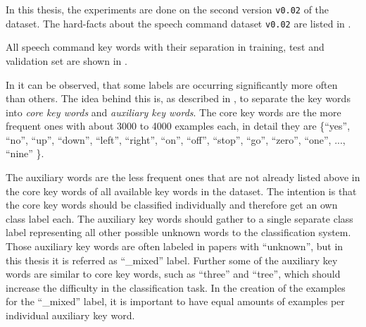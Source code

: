 In this thesis, the experiments are done on the second version \texttt{v0.02} of the dataset.
The hard-facts about the speech command dataset \texttt{v0.02} are listed in .

All speech command key words with their separation in training, test and validation set are shown in .

In  it can be observed, that some labels are occurring significantly more often than others.
The idea behind this is, as described in \cite{Warden2018}, to separate the key words into \emph{core key words} and \emph{auxiliary key words}.
The core key words are the more frequent ones with about 3000 to 4000 examples each, in detail they are \{\enquote{yes}, \enquote{no}, \enquote{up}, \enquote{down}, \enquote{left}, \enquote{right}, \enquote{on}, \enquote{off}, \enquote{stop}, \enquote{go}, \enquote{zero}, \enquote{one}, ..., \enquote{nine} \}.

The auxiliary words are the less frequent ones that are not already listed above in the core key words of all available key words in the dataset.
The intention is that the core key words should be classified individually and therefore get an own class label each. 
The auxiliary key words should gather to a single separate class label representing all other possible unknown words to the classification system.
Those auxiliary key words are often labeled in papers with \enquote{unknown}, but in this thesis it is referred as \enquote{\_mixed} label.
Further some of the auxiliary key words are similar to core key words, such as \enquote{three} and \enquote{tree}, which should increase the difficulty in the classification task.
In the creation of the examples for the \enquote{\_mixed} label, it is important to have equal amounts of examples per individual auxiliary key word.

